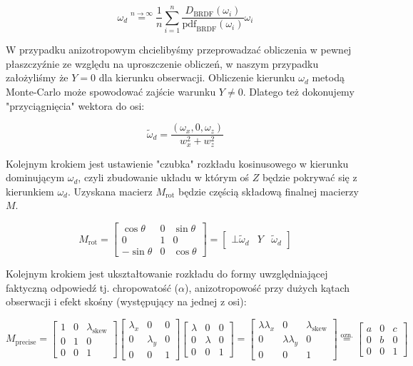 \documentclass[../main.tex]{subfiles}
\begin{document}
$$
\omega_d
\stackrel{n \rightarrow \infty}{=}
\frac{1}{n} \sum_{i=1}^{n} {
  \frac{
    D_{\text{BRDF}}(\omega_i)
  }{
    \text{pdf}_{\text{BRDF}}(\omega_i)
  }
  \omega_i
}
$$

W przypadku anizotropowym chcielibyśmy przeprowadzać obliczenia w pewnej
płaszczyźnie ze względu na uproszczenie obliczeń, w naszym przypadku
założyliśmy że $Y=0$ dla kierunku obserwacji. 
Obliczenie kierunku $\omega_d$ metodą Monte-Carlo może spowodować zajście
warunku $Y \neq 0$. Dlatego też dokonujemy "przyciągnięcia" wektora do
osi:

$$
\widetilde{\omega}_d = \frac{
    \left( \omega_x,0,\omega_z \right)
  }{
    w_x^2+w_z^2
  }
$$

Kolejnym krokiem jest ustawienie "czubka" rozkładu kosinusowego w kierunku
dominującym $\omega_d$, czyli zbudowanie układu w którym oś $Z$ będzie
pokrywać się z kierunkiem $\omega_d$. Uzyskana macierz $M_{\text{rot}}$
będzie częścią składową finalnej macierzy $M$.

$$
M_{\text{rot}} =
\begin{bmatrix}
  \cos\theta  & 0     & \sin\theta \\
  0           & 1     & 0 \\
  -\sin\theta & 0     & \cos\theta
\end{bmatrix}
= \begin{bmatrix}
  \bot {\widetilde{\omega}_d} & Y & \widetilde{\omega}_d
\end{bmatrix}
$$

Kolejnym krokiem jest ukształtowanie rozkładu do formy uwzględniającej
faktyczną odpowiedź tj. chropowatość ($\alpha$), anizotropowość przy
dużych kątach obserwacji i efekt skośny (występujący na jednej z osi):

$$
M_{\text{precise}} =
\begin{bmatrix}
  1 & 0 & \lambda_{\text{skew}} \\
  0 & 1 & 0 \\
  0 & 0 & 1
\end{bmatrix}
\begin{bmatrix}
  \lambda_x & 0 & 0 \\
  0 & \lambda_y & 0 \\
  0 & 0 & 1
\end{bmatrix}
\begin{bmatrix}
  \lambda & 0 & 0 \\
  0 & \lambda & 0 \\
  0 & 0 & 1
\end{bmatrix}
=
\begin{bmatrix}
  \lambda\lambda_x & 0 & \lambda_{\text{skew}} \\
  0 & \lambda\lambda_y & 0 \\
  0 & 0 & 1
\end{bmatrix}
\stackrel{\text{ozn.}}{=}
\begin{bmatrix}
  a & 0 & c \\
  0 & b & 0 \\
  0 & 0 & 1
\end{bmatrix}
$$
\end{document}
